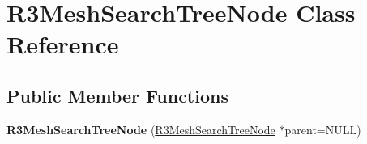 \hypertarget{class_r3_mesh_search_tree_node}{}\section{R3\+Mesh\+Search\+Tree\+Node Class Reference}
\label{class_r3_mesh_search_tree_node}
\subsection*{Public Member Functions}
\begin{DoxyCompactItemize}
\item 
{\bfseries R3\+Mesh\+Search\+Tree\+Node} (\hyperlink{class_r3_mesh_search_tree_node}{R3\+Mesh\+Search\+Tree\+Node} $\ast$parent=N\+U\+LL)\hypertarget{class_r3_mesh_search_tree_node_a51384c13fe4b655b4decbe1ca2c47312}{}\label{class_r3_mesh_search_tree_node_a51384c13fe4b655b4decbe1ca2c47312}

\end{DoxyCompactItemize}
